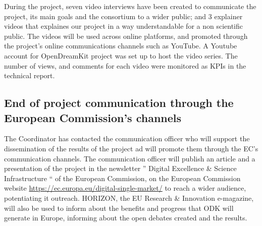 \documentclass{deliverablereport}
\begin{document}


During the project, seven video interviews have been created to
communicate the project, its main goals and the consortium to a wider
public; and 3 explainer videos that explaines our project in a way
understandable for a non scientific public. The videos will be used
across online platforms, and promoted through the project’s online
communications channels such as YouTube. A Youtube account for
OpenDreamKit project was set up to host the video series. The number
of views, and comments for each video were monitored as KPIs in the
technical report.

\subsection{End of project communication through the European Commission's channels}

The Coordinator has contacted the communication officer  who will support the dissemination
of the results of the project ad will promote them through the EC's communication channels. 
The communication officer will publish an article and a presentation of the project in the 
newsletter ” Digital Excellence \& Science Infrastructure “ of the European Commission, 
on the European Commission website \url{https://ec.europa.eu/digital-single-market/} to reach 
a wider audience, potentiating it outreach. 
HORIZON, the EU Research \& Innovation e-magazine, will also be used to inform about 
the benefits and progress that ODK will generate in Europe, informing about 
the open debates created and the results.
\end{document}
